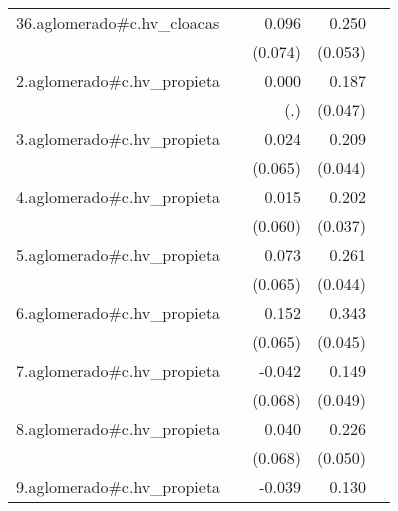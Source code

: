 {\begin{longtable}{l*{4}{D{.}{.}{-1}}}
\addlinespace
36.aglomerado#c.hv\_cloacas&                     &       0.096         &       0.250\sym{***}&                     \\
            &                     &     (0.074)         &     (0.053)         &                     \\
\addlinespace
2.aglomerado#c.hv\_propieta&                     &       0.000         &       0.187\sym{***}&                     \\
            &                     &         (.)         &     (0.047)         &                     \\
\addlinespace
3.aglomerado#c.hv\_propieta&                     &       0.024         &       0.209\sym{***}&                     \\
            &                     &     (0.065)         &     (0.044)         &                     \\
\addlinespace
4.aglomerado#c.hv\_propieta&                     &       0.015         &       0.202\sym{***}&                     \\
            &                     &     (0.060)         &     (0.037)         &                     \\
\addlinespace
5.aglomerado#c.hv\_propieta&                     &       0.073         &       0.261\sym{***}&                     \\
            &                     &     (0.065)         &     (0.044)         &                     \\
\addlinespace
6.aglomerado#c.hv\_propieta&                     &       0.152\sym{*}  &       0.343\sym{***}&                     \\
            &                     &     (0.065)         &     (0.045)         &                     \\
\addlinespace
7.aglomerado#c.hv\_propieta&                     &      -0.042         &       0.149\sym{**} &                     \\
            &                     &     (0.068)         &     (0.049)         &                     \\
\addlinespace
8.aglomerado#c.hv\_propieta&                     &       0.040         &       0.226\sym{***}&                     \\
            &                     &     (0.068)         &     (0.050)         &                     \\
\addlinespace
9.aglomerado#c.hv\_propieta&                     &      -0.039         &       0.130\sym{**} &                     \\

\end{longtable}}
